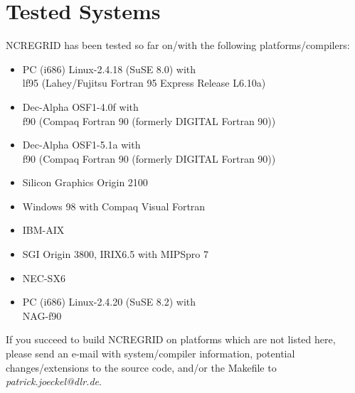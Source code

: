 \documentclass[12pt, a4paper]{article}
\begin{document}

\section{Tested Systems}
\label{sec:systems}
NCREGRID has been tested so far on/with the following platforms/compilers:
\begin{itemize}
\item PC (i686) Linux-2.4.18 (SuSE 8.0) with\\
      lf95 (Lahey/Fujitsu Fortran 95 Express Release L6.10a)
\item Dec-Alpha OSF1-4.0f with\\
      f90 (Compaq Fortran 90 (formerly DIGITAL Fortran 90))
\item Dec-Alpha OSF1-5.1a with\\
      f90 (Compaq Fortran 90 (formerly DIGITAL Fortran 90))
\item Silicon Graphics Origin 2100
\item Windows 98 with Compaq Visual Fortran
\item IBM-AIX
\item SGI Origin 3800, IRIX6.5 with MIPSpro 7
\item NEC-SX6
\item PC (i686) Linux-2.4.20 (SuSE 8.2) with\\
      NAG-f90
\end{itemize}
If you succeed to build NCREGRID on platforms which are not listed here,
please send an e-mail with system/compiler information, potential
changes/extensions to the source code, and/or the Makefile to
{\it patrick.joeckel@dlr.de}.

\end{document}
